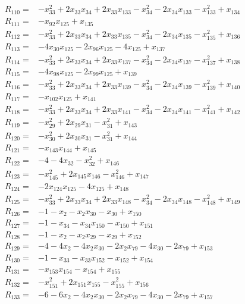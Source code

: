 \begin{align*}
R_{110}={}&-x_{33}^{2}+2x_{33}x_{34}+2x_{33}x_{133}-x_{34}^{2}-2x_{34}x_{133}-x_{133}^{2}+x_{134}\\[3pt]
R_{111}={}&-x_{92}x_{125}+x_{135}\\[3pt]
R_{112}={}&-x_{33}^{2}+2x_{33}x_{34}+2x_{33}x_{135}-x_{34}^{2}-2x_{34}x_{135}-x_{135}^{2}+x_{136}\\[3pt]
R_{113}={}&-4x_{30}x_{125}-2x_{96}x_{125}-4x_{125}+x_{137}\\[3pt]
R_{114}={}&-x_{33}^{2}+2x_{33}x_{34}+2x_{33}x_{137}-x_{34}^{2}-2x_{34}x_{137}-x_{137}^{2}+x_{138}\\[3pt]
R_{115}={}&-4x_{98}x_{125}-2x_{99}x_{125}+x_{139}\\[3pt]
R_{116}={}&-x_{33}^{2}+2x_{33}x_{34}+2x_{33}x_{139}-x_{34}^{2}-2x_{34}x_{139}-x_{139}^{2}+x_{140}\\[3pt]
R_{117}={}&-x_{102}x_{125}+x_{141}\\[3pt]
R_{118}={}&-x_{33}^{2}+2x_{33}x_{34}+2x_{33}x_{141}-x_{34}^{2}-2x_{34}x_{141}-x_{141}^{2}+x_{142}\\[3pt]
R_{119}={}&-x_{29}^{2}+2x_{29}x_{31}-x_{31}^{2}+x_{143}\\[3pt]
R_{120}={}&-x_{30}^{2}+2x_{30}x_{31}-x_{31}^{2}+x_{144}\\[3pt]
R_{121}={}&-x_{143}x_{144}+x_{145}\\[3pt]
R_{122}={}&-4-4x_{32}-x_{32}^{2}+x_{146}\\[3pt]
R_{123}={}&-x_{145}^{2}+2x_{145}x_{146}-x_{146}^{2}+x_{147}\\[3pt]
R_{124}={}&-2x_{124}x_{125}-4x_{125}+x_{148}\\[3pt]
R_{125}={}&-x_{33}^{2}+2x_{33}x_{34}+2x_{33}x_{148}-x_{34}^{2}-2x_{34}x_{148}-x_{148}^{2}+x_{149}\\[3pt]
R_{126}={}&-1-x_{2}-x_{2}x_{30}-x_{30}+x_{150}\\[3pt]
R_{127}={}&-1-x_{34}-x_{34}x_{150}-x_{150}+x_{151}\\[3pt]
R_{128}={}&-1-x_{2}-x_{2}x_{29}-x_{29}+x_{152}\\[3pt]
R_{129}={}&-4-4x_{2}-4x_{2}x_{30}-2x_{2}x_{79}-4x_{30}-2x_{79}+x_{153}\\[3pt]
R_{130}={}&-1-x_{33}-x_{33}x_{152}-x_{152}+x_{154}\\[3pt]
R_{131}={}&-x_{153}x_{154}-x_{154}+x_{155}\\[3pt]
R_{132}={}&-x_{151}^{2}+2x_{151}x_{155}-x_{155}^{2}+x_{156}\\[3pt]
R_{133}={}&-6-6x_{2}-4x_{2}x_{30}-2x_{2}x_{79}-4x_{30}-2x_{79}+x_{157}\\[3pt]

\end{align*}
